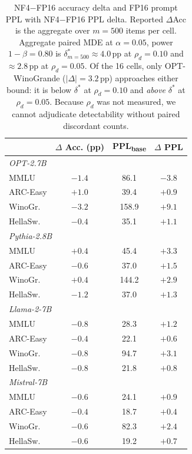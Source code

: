 \documentclass{article}
\begin{document}
\begin{table}[t]
\caption{NF4$-$FP16 accuracy delta and FP16 prompt PPL with NF4$-$FP16 PPL delta. Reported $\Delta$Acc is the aggregate over $m{=}500$ items per cell. Aggregate paired MDE at $\alpha{=}0.05$, power $1-\beta{=}0.80$ is $\delta^*_{m=500}\approx 4.0$\,pp at $\rho_d{=}0.10$ and $\approx 2.8$\,pp at $\rho_d{=}0.05$. Of the 16 cells, only OPT-WinoGrande ($|\Delta|{=}3.2$\,pp) approaches either bound: it is below $\delta^*$ at $\rho_d{=}0.10$ and \emph{above} $\delta^*$ at $\rho_d{=}0.05$. Because $\rho_d$ was not measured, we cannot adjudicate detectability without paired discordant counts.}
\label{tab:quant_impact}
\centering
\small
\begin{tabular}{lccc}
\toprule
& $\Delta$ Acc. (pp) & PPL\textsubscript{base} & $\Delta$ PPL \\
\midrule
\multicolumn{4}{l}{\textit{OPT-2.7B}} \\
\quad MMLU      & $-1.4$ & 86.1 & $-3.8$ \\
\quad ARC-Easy  & $+1.0$ & 39.4 & $+0.9$ \\
\quad WinoGr.   & $-3.2$ & 158.9 & $+9.1$ \\
\quad HellaSw.  & $-0.4$ & 35.1 & $+1.1$ \\
\midrule
\multicolumn{4}{l}{\textit{Pythia-2.8B}} \\
\quad MMLU      & $+0.4$ & 45.4 & $+3.3$ \\
\quad ARC-Easy  & $-0.6$ & 37.0 & $+1.5$ \\
\quad WinoGr.   & $+0.4$ & 144.2 & $+2.9$ \\
\quad HellaSw.  & $-1.2$ & 37.0 & $+1.3$ \\
\midrule
\multicolumn{4}{l}{\textit{Llama-2-7B}} \\
\quad MMLU      & $-0.8$ & 28.3 & $+1.2$ \\
\quad ARC-Easy  & $-0.4$ & 22.1 & $+0.6$ \\
\quad WinoGr.   & $-0.8$ & 94.7 & $+3.1$ \\
\quad HellaSw.  & $-0.8$ & 21.8 & $+0.8$ \\
\midrule
\multicolumn{4}{l}{\textit{Mistral-7B}} \\
\quad MMLU      & $-0.6$ & 24.1 & $+0.9$ \\
\quad ARC-Easy  & $-0.4$ & 18.7 & $+0.4$ \\
\quad WinoGr.   & $-0.6$ & 82.3 & $+2.4$ \\
\quad HellaSw.  & $-0.6$ & 19.2 & $+0.7$ \\
\bottomrule
\end{tabular}
\end{table}
\end{document}
